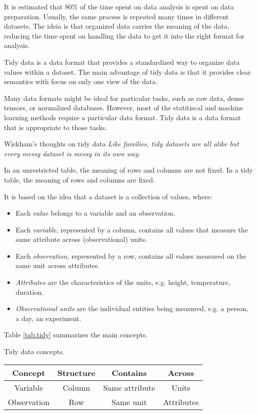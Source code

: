 It is estimated that 80\% of the time spent on data analysis is spent on data preparation.
Usually, the same process is repeated many times in different datasets. The ideia is that
organized data carries the meaning of the data, reducing the time spent on handling
the data to get it into the right format for analysis.

Tidy data is a data format that provides a standardized way to organize data values within
a dataset.  The main advantage of tidy data is that it provides clear semantics with focus
on only one view of the data.

Many data formats might be ideal for particular tasks, such as raw data, dense tensors, or
normalized databases.  However, most of the statitiscal and machine learning methods
require a particular data format.  Tidy data is a data format that is appropriate to those
tasks.

\begin{mainbox}{Wickham's thoughts on tidy data}
  \em
  Like families, tidy datasets are all alike but every messy dataset is messy in its own
  way.
\end{mainbox}

In an unrestricted table, the meaning of rows and columns are not fixed.  In a tidy table,
the meaning of rows and columns are fixed.

It is based on the idea that a dataset is a collection of values, where:
\begin{itemize}
  \item Each \emph{value} belongs to a variable and an observation.
  \item Each \emph{variable}, represented by a column, contains all values that measure
    the same attribute across (observational) units.
  \item Each \emph{observation}, represented by a row, contains all values measured on the
    same unit across attributes.
  \item \emph{Attributes} are the characteristics of the units, e.g. height, temperature,
    duration.
  \item \emph{Observational units} are the individual entities being measured, e.g. a
    person, a day, an experiment.
\end{itemize}
Table \ref{tab:tidy} summarizes the main concepts.

\begin{tablebox}[label=tab:tidy]{Tidy data concepts.}
  \centering
  \begin{tabular}{cccc}
    \toprule
    \textbf{Concept} & \textbf{Structure} & \textbf{Contains} & \textbf{Across} \\
    \midrule
    Variable & Column & Same attribute & Units \\
    Observation & Row & Same unit & Attributes \\
    \bottomrule
  \end{tabular}
\end{tablebox}

